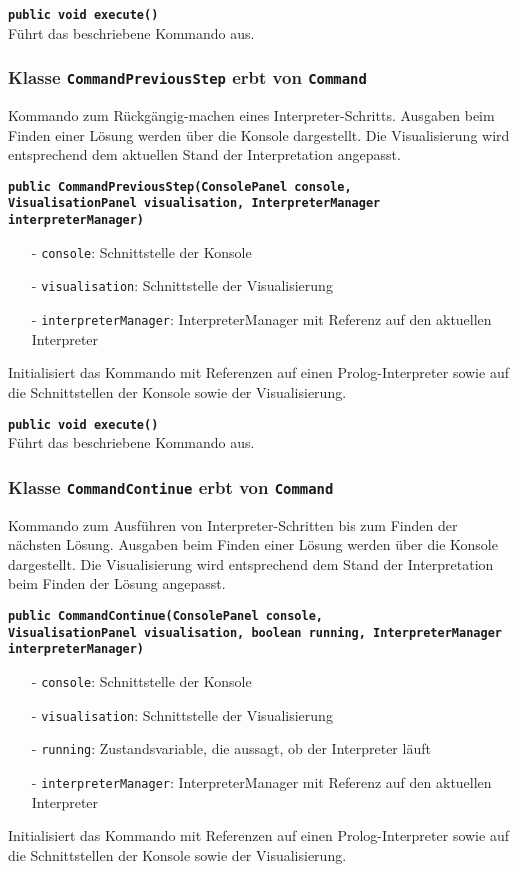 \documentclass[parskip=full,11pt,twoside]{scrartcl}
\begin{document}
\textbf{\texttt{public void execute()}}\\
Führt das beschriebene Kommando aus.

\subsubsection{Klasse \texttt{CommandPreviousStep} erbt von \texttt{Command}}

Kommando zum Rückgängig-machen eines Interpreter-Schritts. Ausgaben beim Finden einer Lösung werden über die Konsole dargestellt. Die Visualisierung wird entsprechend dem aktuellen Stand der Interpretation angepasst.

\textbf{\texttt{public CommandPreviousStep(ConsolePanel console,\\VisualisationPanel visualisation, InterpreterManager interpreterManager)}}
\begin{itemize}[noitemsep]
	\item[-] \texttt{console}: Schnittstelle der Konsole
	\item[-] \texttt{visualisation}: Schnittstelle der Visualisierung
	\item[-] \texttt{interpreterManager}: InterpreterManager mit Referenz auf den aktuellen Interpreter
\end{itemize}
Initialisiert das Kommando mit Referenzen auf einen Prolog-Interpreter sowie auf die Schnittstellen der Konsole sowie der Visualisierung.

\textbf{\texttt{public void execute()}}\\
Führt das beschriebene Kommando aus.

\subsubsection{Klasse \texttt{CommandContinue} erbt von \texttt{Command}}

Kommando zum Ausführen von Interpreter-Schritten bis zum Finden der nächsten Lösung. Ausgaben beim Finden einer Lösung werden über die Konsole dargestellt. Die Visualisierung wird entsprechend dem Stand der Interpretation beim Finden der Lösung angepasst.

\textbf{\texttt{public CommandContinue(ConsolePanel console,\\VisualisationPanel visualisation, boolean running, InterpreterManager interpreterManager)}}
\begin{itemize}[noitemsep]
	\item[-] \texttt{console}: Schnittstelle der Konsole
	\item[-] \texttt{visualisation}: Schnittstelle der Visualisierung
    \item[-] \texttt{running}: Zustandsvariable, die aussagt, ob der Interpreter läuft
	\item[-] \texttt{interpreterManager}: InterpreterManager mit Referenz auf den aktuellen Interpreter
\end{itemize}
Initialisiert das Kommando mit Referenzen auf einen Prolog-Interpreter sowie auf die Schnittstellen der Konsole sowie der Visualisierung.
\end{document}
